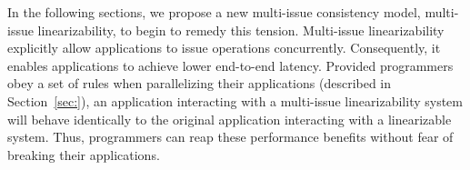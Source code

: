 In the following sections, we propose a new multi-issue consistency model, multi-issue linearizability, to begin to remedy this tension. Multi-issue linearizability explicitly allow applications to issue operations concurrently. Consequently, it enables applications to achieve lower end-to-end latency. Provided programmers obey a set of rules when parallelizing their applications (described in Section~\ref{sec:}), an application interacting with a multi-issue linearizability system will behave identically to the original application interacting with a linearizable system. Thus, programmers can reap these performance benefits without fear of breaking their applications.

